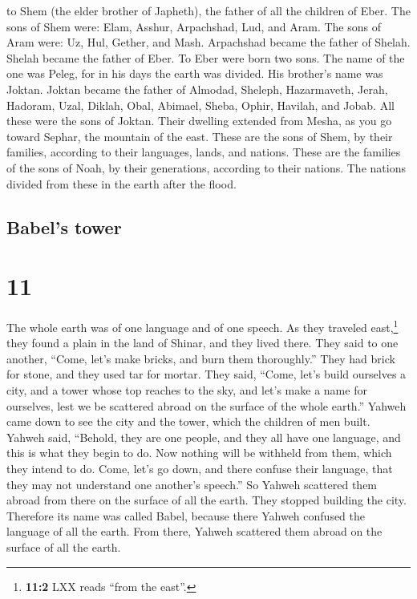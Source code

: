 to Shem (the elder brother of Japheth), the father of all the children
of Eber.  The sons of Shem were: Elam, Asshur,
Arpachshad, Lud, and Aram.  The sons of Aram were: Uz,
Hul, Gether, and Mash.  Arpachshad became the father of
Shelah. Shelah became the father of Eber.  To Eber were
born two sons. The name of the one was Peleg, for in his days the earth
was divided. His brother's name was Joktan.  Joktan
became the father of Almodad, Sheleph, Hazarmaveth, Jerah,
 Hadoram, Uzal, Diklah,  Obal, Abimael,
Sheba,  Ophir, Havilah, and Jobab. All these were the
sons of Joktan.  Their dwelling extended from Mesha, as
you go toward Sephar, the mountain of the east.  These
are the sons of Shem, by their families, according to their languages,
lands, and nations.  These are the families of the sons
of Noah, by their generations, according to their nations. The nations
divided from these in the earth after the flood.

\hypertarget{babels-tower}{%
\subsection{Babel's tower}\label{babels-tower}}

\hypertarget{section-10}{%
\section{11}\label{section-10}}

 The whole earth was of one language and of one speech.
 As they traveled east,\footnote{\textbf{11:2} LXX reads
  ``from the east''.} they found a plain in the land of Shinar, and they
lived there.  They said to one another, ``Come, let's make
bricks, and burn them thoroughly.'' They had brick for stone, and they
used tar for mortar.  They said, ``Come, let's build
ourselves a city, and a tower whose top reaches to the sky, and let's
make a name for ourselves, lest we be scattered abroad on the surface of
the whole earth.''  Yahweh came down to see the city and
the tower, which the children of men built.  Yahweh said,
``Behold, they are one people, and they all have one language, and this
is what they begin to do. Now nothing will be withheld from them, which
they intend to do.  Come, let's go down, and there confuse
their language, that they may not understand one another's speech.''
 So Yahweh scattered them abroad from there on the surface
of all the earth. They stopped building the city. 
Therefore its name was called Babel, because there Yahweh confused the
language of all the earth. From there, Yahweh scattered them abroad on
the surface of all the earth.

